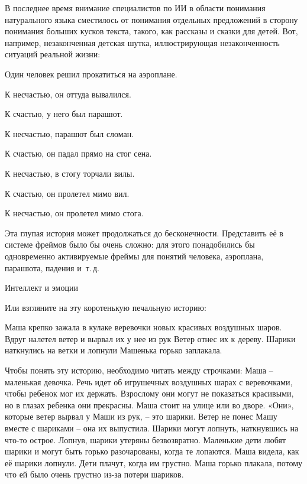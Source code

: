 \documentclass[../main.tex]{subfiles}
\begin{document}
В последнее время внимание специалистов по ИИ в области понимания натурального языка сместилось от понимания отдельных предложений в сторону понимания больших кусков текста, такого, как рассказы и сказки для детей. Вот, например, незаконченная детская шутка, иллюстрирующая незаконченность ситуаций реальной жизни:

Один человек решил прокатиться на аэроплане.

К несчастью, он оттуда вывалился.

К счастью, у него был парашют.

К несчастью, парашют был сломан.

К счастью, он падал прямо на стог сена.

К несчастью, в стогу торчали вилы.

К счастью, он пролетел мимо вил.

К несчастью, он пролетел мимо стога.

Эта глупая история может продолжаться до бесконечности. Представить её в системе фреймов было бы очень сложно: для этого понадобились бы одновременно активируемые фреймы для понятий человека, аэроплана, парашюта, падения и~т.\,д.

Интеллект и эмоции

Или взгляните на эту коротенькую печальную историю:

Маша крепко зажала в кулаке веревочки новых красивых воздушных шаров. Вдруг налетел ветер и вырвал их у нее из рук Ветер отнес их к дереву. Шарики наткнулись на ветки и лопнули Машенька горько заплакала.

Чтобы понять эту историю, необходимо читать между строчками: Маша \--- маленькая девочка. Речь идет об игрушечных воздушных шарах с веревочками, чтобы ребенок мог их держать. Взрослому они могут не показаться красивыми, но в глазах ребенка они прекрасны. Маша стоит на улице или во дворе. «Они», которые ветер вырвал у Маши из рук, \--- это шарики. Ветер не понес Машу вместе с шариками \--- она их выпустила. Шарики могут лопнуть, наткнувшись на что-то острое. Лопнув, шарики утеряны безвозвратно. Маленькие дети любят шарики и могут быть горько разочарованы, когда те лопаются. Маша видела, как её шарики лопнули. Дети плачут, когда им грустно. Маша горько плакала, потому что ей было очень грустно из-за потери шариков.
\end{document}
